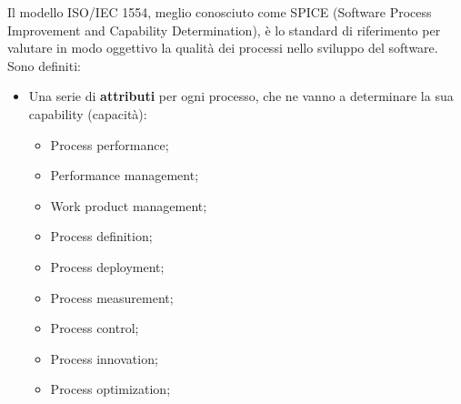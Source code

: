 Il modello ISO/IEC 1554, meglio conosciuto come SPICE (Software Process Improvement and Capability Determination), è lo standard di riferimento per valutare in modo oggettivo la qualità dei processi nello sviluppo del software. \newline
Sono definiti:
\begin{itemize}
	\item Una serie di \textbf{attributi} per ogni processo, che ne vanno a determinare la sua capability (capacità):
	\begin{itemize}
	    \item Process performance;
	    \item Performance management;
	    \item Work product management;
	    \item Process definition;
	    \item Process deployment;
	    \item Process measurement;
	    \item Process control;
	    \item Process innovation;
	    \item Process optimization;
	\end{itemize}
	

\end{itemize}
